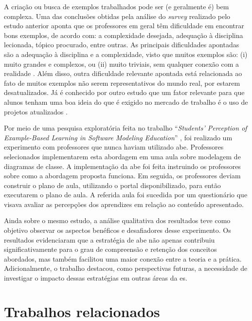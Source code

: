 A criação ou busca de exemplos trabalhados pode ser (e geralmente é) bem complexa. Uma das conclusões obtidas pela análise do \textit{survey} realizado pelo estudo anterior aponta que os professores em geral têm dificuldade em encontrar bons exemplos, de acordo com: a complexidade desejada, adequação à disciplina lecionada, tópico procurado, entre outras. As principais dificuldades apontadas são a adequação à disciplina e a complexidade, visto que muitos exemplos são: (i) muito grandes e complexos, ou (ii) muito triviais, sem qualquer conexão com a realidade \cite{Simone.Tonhao-etal:2021}. Além disso, outra dificuldade relevante apontada está relacionada ao fato de muitos exemplos não serem representativos do mundo real, por estarem desatualizados. Já é conhecido por outro estudo que um fator relevante para que alunos tenham uma boa ideia do que é exigido no mercado de trabalho é o uso de projetos atualizados \cite{OSSProjects-TheProfessors'Perspective}.

Por meio de uma pesquisa exploratória feita no trabalho ``\textit{Students’ Perception of Example-Based Learning in Software Modeling Education}'' \cite{Tiago.Bonetti-etal:2023}, foi realizado um experimento com professores que nunca haviam utilizado \gls{abe}. Professores selecionados implementarem esta abordagem em uma aula sobre modelagem de diagramas de classe. A implementação da \gls{abe} foi feita instruindo os professores sobre como a abordagem proposta funciona. Em seguida, os professores deviam construir o plano de aula, utilizando o portal disponibilizado, para então executarem o plano de aula. A referida aula foi sucedida por um questionário que visava avaliar as percepções dos aprendizes em relação ao conteúdo apresentado. 

Ainda sobre o mesmo estudo, a análise qualitativa dos resultados teve como objetivo observar os aspectos benéficos e desafiadores desse experimento. Os resultados evidenciaram que a estratégia de \gls{abe} não apenas contribuiu significativamente para o grau de compreensão e retenção dos conceitos abordados, mas também facilitou uma maior conexão entre a teoria e a prática. Adicionalmente, o trabalho destacou, como perspectivas futuras, a necessidade de investigar o impacto dessas estratégias em outras áreas da \gls{es}.

\section{Trabalhos relacionados}
\label{section:related-work}

